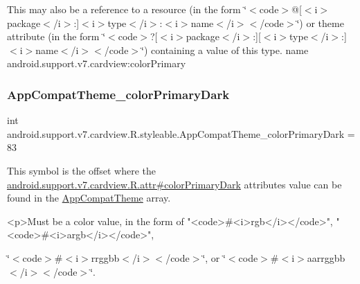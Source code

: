 This may also be a reference to a resource (in the form \char`\"{}$<$code$>$@\mbox{[}$<$i$>$package$<$/i$>$\+:\mbox{]}$<$i$>$type$<$/i$>$\+:$<$i$>$name$<$/i$>$$<$/code$>$\char`\"{}) or theme attribute (in the form \char`\"{}$<$code$>$?\mbox{[}$<$i$>$package$<$/i$>$\+:\mbox{]}\mbox{[}$<$i$>$type$<$/i$>$\+:\mbox{]}$<$i$>$name$<$/i$>$$<$/code$>$\char`\"{}) containing a value of this type.  name android.\+support.\+v7.\+cardview\+:color\+Primary \mbox{\label{classandroid_1_1support_1_1v7_1_1cardview_1_1R_1_1styleable_a43a0f2dbaa8e5b83115079105d180ee5}} 
\subsubsection{\texorpdfstring{App\+Compat\+Theme\+\_\+color\+Primary\+Dark}{AppCompatTheme\_colorPrimaryDark}}
{\footnotesize\ttfamily int android.\+support.\+v7.\+cardview.\+R.\+styleable.\+App\+Compat\+Theme\+\_\+color\+Primary\+Dark = 83\hspace{0.3cm}{\ttfamily [static]}}

This symbol is the offset where the \hyperlink{classandroid_1_1support_1_1v7_1_1cardview_1_1R_1_1attr_a715999d97332e449ff29b09233a24854}{android.\+support.\+v7.\+cardview.\+R.\+attr\#color\+Primary\+Dark} attribute\textquotesingle{}s value can be found in the \hyperlink{classandroid_1_1support_1_1v7_1_1cardview_1_1R_1_1styleable_a52e6f69f954ecc2622d72c0b4d298938}{App\+Compat\+Theme} array.

\begin{DoxyVerb}      <p>Must be a color value, in the form of "<code>#<i>rgb</i></code>", "<code>#<i>argb</i></code>",
\end{DoxyVerb}
 \char`\"{}$<$code$>$\#$<$i$>$rrggbb$<$/i$>$$<$/code$>$\char`\"{}, or \char`\"{}$<$code$>$\#$<$i$>$aarrggbb$<$/i$>$$<$/code$>$\char`\"{}. 

